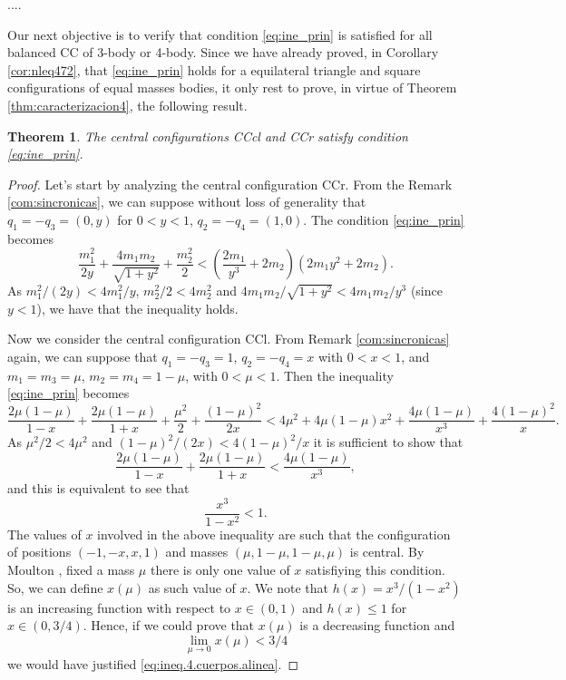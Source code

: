 \documentclass[twoside]{article}
\newtheorem{thm}{Theorem}[section]
\theoremstyle{remark}
\begin{document}
....


Our next objective is to verify that condition \eqref{eq:ine_prin} is satisfied for all balanced CC of 3-body or 4-body. Since we have already proved, in  Corollary \ref{cor:nleq472}, that \eqref{eq:ine_prin} holds for a equilateral triangle and square configurations of equal masses bodies, it only rest to prove, in virtue of Theorem \ref{thm:caracterizacion4}, the following result.



\begin{thm}\label{thm:CC.3.4.satis.cond.adm}
The central configurations CCcl and CCr satisfy condition \eqref{eq:ine_prin}.
\end{thm}



\begin{proof}

Let's start by analyzing the central configuration CCr. From the Remark \ref{com:sincronicas}, we can suppose without loss of generality that $ q_1 = -q_3 = (0, y) $ for $ 0<y<1 $, $ q_2 = -q_4 = (1,0) $. The condition \eqref{eq:ine_prin} becomes
\[\frac{m_1^2}{2y}+\frac{4m_1m_2}{\sqrt{1+y^2}}+\frac{m_2^2}{2}<\left(\frac{2m_1}{y^3}+2m_2\right) \left(2m_1y^2+2m_2\right).\]
As $m_1^2/(2y)<4m_1^2/y$, $m_2^2/2<4m_2^2$ and $4m_1m_2/\sqrt{1+y^2}<4m_1m_2/y^3$ (since $y<1$), we have that the inequality holds.

 Now we consider the central configuration CCl. From Remark \ref{com:sincronicas} again, we can suppose  that $q_1=-q_3=1$, $q_2=-q_4=x$ with $0<x<1$, and $m_1=m_3=\mu$, $m_2=m_4=1-\mu$, with $0<\mu<1$.  Then the inequality \eqref{eq:ine_prin} becomes
\[\frac{2\mu(1-\mu)}{1-x} +\frac{2\mu(1-\mu)}{1+x}+\frac{\mu^2}{2}+\frac{(1-\mu)^2}{2x}<4\mu^2+4\mu(1-\mu)x^2+\frac{4\mu(1-\mu)}{x^3}+\frac{4(1-\mu)^2}{x}.\]
As $ \mu ^ 2/2 <4 \mu^2$ and $ (1-\mu)^2/(2x)< 4(1-\mu)^2/x $ it is sufficient to show that
\[\frac{2\mu(1-\mu)}{1-x} +\frac{2\mu(1-\mu)}{1+x}<\frac{4\mu(1-\mu)}{x^3},\]
and this is equivalent to see that
\begin{equation}\label{eq:ineq.4.cuerpos.alinea}
\frac{x^3}{1-x^2}<1.
\end{equation}
The values of $x$ involved in the above inequality are such that the configuration of positions $(-1,-x,x,1)$ and masses $(\mu,1-\mu,1-\mu,\mu)$ is central. By Moulton \cite{moulton1910straight}, fixed a mass $\mu$ there is only one value of $x$ satisfiying this condition. So, we can define $x(\mu)$ as such value of $x$.  We note that $h(x)=x^3/(1-x^2)$ is an increasing function with respect to $x\in (0,1)$ and $h(x)\leq 1$ for $x\in (0,3/4)$. Hence, if we could prove that $x(\mu)$ is a decreasing function and
\begin{equation}\label{eq:ineq.4.cuerpos.lim0}
\lim\limits_{\mu\to 0}x(\mu)<3/4
\end{equation}
we would have justified \eqref {eq:ineq.4.cuerpos.alinea}.


\end{proof}
\end{document}
